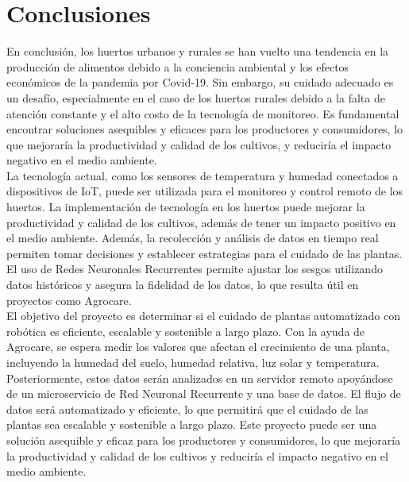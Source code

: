 \section{Conclusiones}
En conclusión, los huertos urbanos y rurales se han vuelto una tendencia en la producción de alimentos debido a la conciencia ambiental y los efectos económicos de la pandemia por Covid-19. Sin embargo, su cuidado adecuado es un desafío, especialmente en el caso de los huertos rurales debido a la falta de atención constante y el alto costo de la tecnología de monitoreo. Es fundamental encontrar soluciones asequibles y eficaces para los productores y consumidores, lo que mejoraría la productividad y calidad de los cultivos, y reduciría el impacto negativo en el medio ambiente.\\

La tecnología actual, como los sensores de temperatura y humedad conectados a dispositivos de IoT, puede ser utilizada para el monitoreo y control remoto de los huertos. La implementación de tecnología en los huertos puede mejorar la productividad y calidad de los cultivos, además de tener un impacto positivo en el medio ambiente. Además, la recolección y análisis de datos en tiempo real permiten tomar decisiones y establecer estrategias para el cuidado de las plantas. El uso de Redes Neuronales Recurrentes permite ajustar los sesgos utilizando datos históricos y asegura la fidelidad de los datos, lo que resulta útil en proyectos como Agrocare.\\

El objetivo del proyecto es determinar si el cuidado de plantas automatizado con robótica es eficiente, escalable y sostenible a largo plazo. Con la ayuda de Agrocare, se espera medir los valores que afectan el crecimiento de una planta, incluyendo la humedad del suelo, humedad relativa, luz solar y temperatura. Posteriormente, estos datos serán analizados en un servidor remoto apoyándose de un microservicio de Red Neuronal Recurrente y una base de datos. El flujo de datos será automatizado y eficiente, lo que permitirá que el cuidado de las plantas sea escalable y sostenible a largo plazo. Este proyecto puede ser una solución asequible y eficaz para los productores y consumidores, lo que mejoraría la productividad y calidad de los cultivos y reduciría el impacto negativo en el medio ambiente.